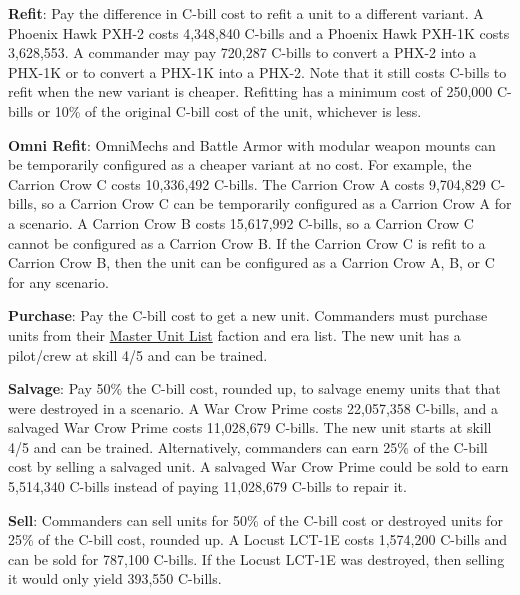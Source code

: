 \begin{description}
\item {\bfseries Refit}: Pay the difference in C-bill cost to refit a unit to a different variant.
A Phoenix Hawk PXH-2 costs 4,348,840 C-bills and a Phoenix Hawk PXH-1K costs 3,628,553.
A commander may pay 720,287 C-bills to convert a PHX-2 into a PHX-1K or to convert a PHX-1K into a PHX-2.
Note that it still costs C-bills to refit when the new variant is cheaper.
Refitting has a minimum cost of 250,000 C-bills or 10\% of the original C-bill cost of the unit, whichever is less.

\item {\bfseries Omni Refit}: OmniMechs and Battle Armor with modular weapon mounts can be temporarily configured as a cheaper variant at no cost.
For example, the Carrion Crow C costs 10,336,492 C-bills.
The Carrion Crow A costs 9,704,829 C-bills, so a Carrion Crow C can be temporarily configured as a Carrion Crow A for a scenario.
A Carrion Crow B costs 15,617,992 C-bills, so a Carrion Crow C cannot be configured as a Carrion Crow B.
If the Carrion Crow C is refit to a Carrion Crow B, then the unit can be configured as a Carrion Crow A, B, or C for any scenario.

\item {\bfseries Purchase}: Pay the C-bill cost to get a new unit.
Commanders must purchase units from their \href{http://www.masterunitlist.info}{Master Unit List} faction and era list.
The new unit has a pilot/crew at skill 4/5 and can be trained.

\item {\bfseries Salvage}: Pay 50\% the C-bill cost, rounded up, to salvage enemy units that that were destroyed in a scenario.
A War Crow Prime costs 22,057,358 C-bills, and a salvaged War Crow Prime costs 11,028,679 C-bills.
The new unit starts at skill 4/5 and can be trained.
Alternatively, commanders can earn 25\% of the C-bill cost by selling a salvaged unit.
A salvaged War Crow Prime could be sold to earn 5,514,340 C-bills instead of paying 11,028,679 C-bills to repair it.

\item {\bfseries Sell}: Commanders can sell units for 50\% of the C-bill cost or destroyed units for 25\% of the C-bill cost, rounded up.
A Locust LCT-1E costs 1,574,200 C-bills and can be sold for 787,100 C-bills.
If the Locust LCT-1E was destroyed, then selling it would only yield 393,550 C-bills.

\end{description}
